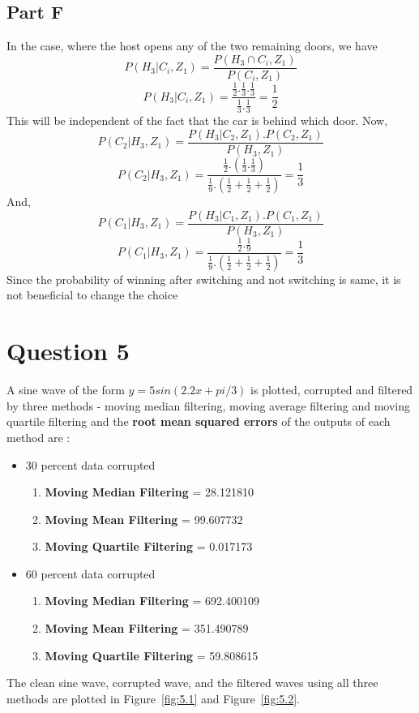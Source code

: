 \documentclass[12pt]{article}
\begin{document}
\subsection*{Part F}
In the case, where the host opens any of the two remaining doors, we have
$$P(H_3|C_i,Z_1) = \frac{P(H_3 \cap C_i, Z_1)}{P(C_i,Z_1)}$$
$$P(H_3|C_i,Z_1) = \frac{\frac{1}{2}.\frac{1}{3}.\frac{1}{3}}{\frac{1}{3}.\frac{1}{3}} = \frac{1}{2}$$
This will be independent of the fact that the car is behind which door.\newline\newline
Now, 
$$P(C_2|H_3,Z_1) = \frac{P(H_3|C_2,Z_1).P(C_2,Z_1)}{P(H_3,Z_1)}$$
$$P(C_2|H_3,Z_1) = \frac{\frac{1}{2}.(\frac{1}{3}.\frac{1}{3})}{\frac{1}{9}.(\frac{1}{2}+\frac{1}{2}+\frac{1}{2})} = \frac{1}{3}$$
And,
$$P(C_1|H_3,Z_1) = \frac{P(H_3|C_1,Z_1).P(C_1,Z_1)}{P(H_3,Z_1)}$$
$$P(C_1|H_3,Z_1) = \frac{\frac{1}{2}.\frac{1}{9}}{\frac{1}{9}.(\frac{1}{2}+\frac{1}{2}+\frac{1}{2})} = \frac{1}{3}$$
Since the probability of winning after switching and not switching is same, it is not beneficial to change the choice
\newpage
\section{Question 5}
A sine wave of the form $y=5sin(2.2x + pi/3)$ is plotted, corrupted and filtered by three methods - moving median filtering, moving average filtering and moving quartile filtering and the \textbf{root mean squared errors} of the outputs of each method are : 
\begin{itemize}
\item 30 percent data corrupted
	\begin{enumerate}
	\item \textbf{Moving Median Filtering} = 28.121810
	\item \textbf{Moving Mean Filtering} = 99.607732
	\item \textbf{Moving Quartile Filtering} = 0.017173
	\end{enumerate}
\item 60 percent data corrupted
	\begin{enumerate}
	\item \textbf{Moving Median Filtering} = 692.400109
	\item \textbf{Moving Mean Filtering} = 351.490789
	\item \textbf{Moving Quartile Filtering} = 59.808615
	\end{enumerate}
\end{itemize}
The clean sine wave, corrupted wave, and the filtered waves using all three methods are plotted in Figure~\ref{fig:5.1} and Figure~\ref{fig:5.2}.
\end{document}
